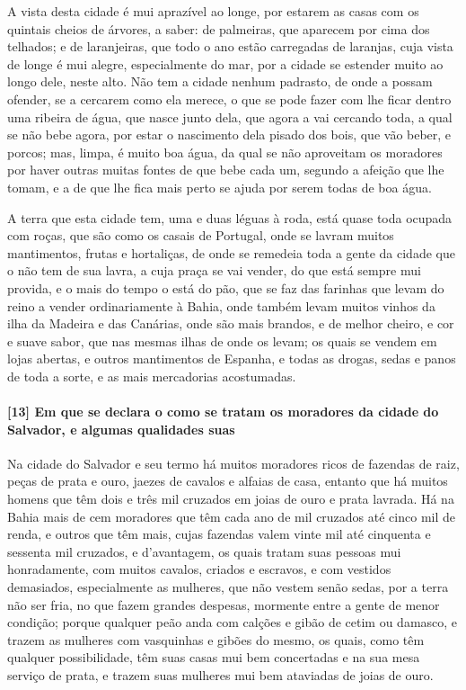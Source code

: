 A vista desta cidade é mui aprazível ao longe, por estarem as casas com os quintais cheios
de árvores, a saber: de palmeiras, que aparecem por cima dos telhados; e de laranjeiras,
que todo o ano estão carregadas de laranjas, cuja vista de longe é mui alegre,
especialmente do mar, por a cidade se estender muito ao longo dele, neste alto. Não tem a
cidade nenhum padrasto, de onde a possam ofender, se a cercarem como ela merece, o que se
pode fazer com lhe ficar dentro uma ribeira de água, que nasce junto dela, que agora a vai
cercando toda, a qual se não bebe agora, por estar o nascimento dela pisado dos bois, que
vão beber, e porcos; mas, limpa, é muito boa água, da qual se não aproveitam os moradores
por haver outras muitas fontes de que bebe cada um, segundo a afeição que lhe tomam, e a
de que lhe fica mais perto se ajuda por serem todas de boa água.

A terra que esta cidade tem, uma e duas léguas à roda, está quase toda ocupada com roças,
que são como os casais de Portugal, onde se lavram muitos mantimentos, frutas e
hortaliças, de onde se remedeia toda a gente da cidade que o não tem de sua lavra, a cuja
praça se vai vender, do que está sempre mui provida, e o mais do tempo o está do pão, que
se faz das farinhas que levam do reino a vender ordinariamente à Bahia, onde também levam
muitos vinhos da ilha da Madeira e das Canárias, onde são mais brandos, e de melhor
cheiro, e cor e suave sabor, que nas mesmas ilhas de onde os levam; os quais se vendem em
lojas abertas, e outros mantimentos de Espanha, e todas as drogas, sedas e panos de toda a
sorte, e as mais mercadorias acostumadas.

\paragraph{[13] Em que se declara o como se tratam os moradores da cidade do Salvador, e
algumas qualidades suas} \quad
Na cidade do Salvador e seu termo há muitos moradores ricos de fazendas de raiz, peças de
prata e ouro, jaezes de cavalos e alfaias de casa, entanto que há muitos homens que têm
dois e três mil cruzados em joias de ouro e prata lavrada. Há na Bahia mais de cem
moradores que têm cada ano de mil cruzados até cinco mil de renda, e outros que têm mais,
cujas fazendas valem vinte mil até cinquenta e sessenta mil cruzados, e d'avantagem, os
quais tratam suas pessoas mui honradamente, com muitos cavalos, criados e escravos, e com
vestidos demasiados, especialmente as mulheres, que não vestem senão sedas, por a terra
não ser fria, no que fazem grandes despesas, mormente entre a gente de menor condição;
porque qualquer peão anda com calções e gibão de cetim ou damasco, e trazem as mulheres
com vasquinhas e gibões do mesmo, os quais, como têm qualquer possibilidade, têm suas
casas mui bem concertadas e na sua mesa serviço de prata, e trazem suas mulheres mui bem
ataviadas de joias de ouro.

